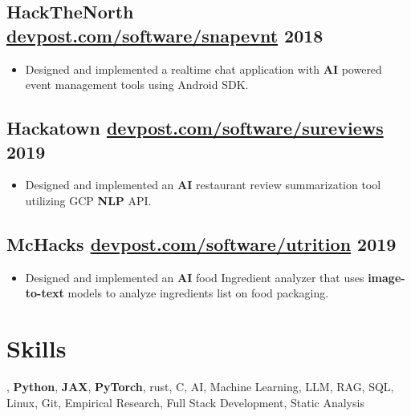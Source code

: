\documentclass[10pt,letterpaper]{article}
\newcommand{\datedsubsection}[2]{\subsection[#1]{#1 \hfill #2}}
\renewcommand{\emph}[1]{{\color{emphcolor}\bfseries#1}}
\begin{document}
\datedsubsection{HackTheNorth \href{https://devpost.com/software/snapevnt}{devpost.com/software/snapevnt}}{2018}
\begin{itemize}
    \item Designed and implemented a realtime chat application with \emph{AI} powered
    event management tools using Android SDK.
\end{itemize}
\datedsubsection{Hackatown \href{https://devpost.com/software/sureviews}{devpost.com/software/sureviews}}{2019}
\begin{itemize}
    \item Designed and implemented an \emph{AI} restaurant review summarization
    tool utilizing GCP \emph{NLP} API.
\end{itemize}
\datedsubsection{McHacks \href{https://devpost.com/software/utrition}{devpost.com/software/utrition}}{2019}
\begin{itemize}
    \item Designed and implemented an \emph{AI} food Ingredient analyzer that
    uses \emph{image-to-text} models to analyze ingredients list on food
    packaging.
\end{itemize}

\section{Skills}
\vspace{1pt}
\noindent \emph{C++20}, \emph{Python}, \emph{JAX}, \emph{PyTorch}, rust, C, AI, Machine Learning, LLM, RAG, SQL, Linux, Git, Empirical Research, Full Stack Development, Static Analysis
\end{document}
